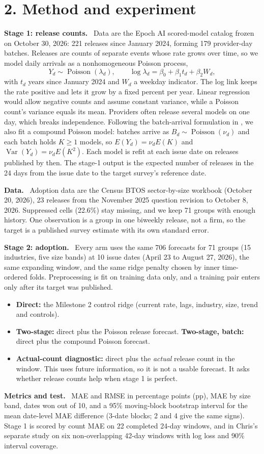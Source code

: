\documentclass[10pt]{article}
\newcommand{\sub}[1]{\textbf{#1}\ }
\begin{document}
\section{2. Method and experiment}
\sub{Stage 1: release counts.} Data are the Epoch AI scored-model catalog frozen on October 30, 2026: 221 releases since January 2024, forming 179 provider-day batches. Releases are counts of separate events whose rate grows over time, so we model daily arrivals as a nonhomogeneous Poisson process,
\[
Y_d\sim\operatorname{Poisson}(\lambda_d),\qquad \log\lambda_d=\beta_0+\beta_1 t_d+\beta_2 W_d,
\]
with $t_d$ years since January 2024 and $W_d$ a weekday indicator. The log link keeps the rate positive and lets it grow by a fixed percent per year. Linear regression would allow negative counts and assume constant variance, while a Poisson count's variance equals its mean. Providers often release several models on one day, which breaks independence. Following the batch-arrival formulation in \cite{compound}, we also fit a compound Poisson model: batches arrive as $B_d\sim\operatorname{Poisson}(\nu_d)$ and each batch holds $K\ge1$ models, so $E(Y_d)=\nu_dE(K)$ and $\operatorname{Var}(Y_d)=\nu_dE(K^2)$. Each model is refit at each issue date on releases published by then. The stage-1 output is the expected number of releases in the 24 days from the issue date to the target survey's reference date.

\sub{Data.} Adoption data are the Census BTOS sector-by-size workbook (October 20, 2026), 23 releases from the November 2025 question revision to October 8, 2026. Suppressed cells (22.6\%) stay missing, and we keep 71 groups with enough history. One observation is a group in one biweekly release, not a firm, so the target is a published survey estimate with its own standard error.

\sub{Stage 2: adoption.} Every arm uses the same 706 forecasts for 71 groups (15 industries, five size bands) at 10 issue dates (April 23 to August 27, 2026), the same expanding window, and the same ridge penalty chosen by inner time-ordered folds. Preprocessing is fit on training data only, and a training pair enters only after its target was published.
\begin{itemize}
\item \textbf{Direct:} the Milestone 2 control ridge (current rate, lags, industry, size, trend and controls).
\item \textbf{Two-stage:} direct plus the Poisson release forecast. \textbf{Two-stage, batch:} direct plus the compound Poisson forecast.
\item \textbf{Actual-count diagnostic:} direct plus the \emph{actual} release count in the window. This uses future information, so it is not a usable forecast. It asks whether release counts help when stage 1 is perfect.
\end{itemize}
\sub{Metrics and test.} MAE and RMSE in percentage points (pp), MAE by size band, dates won out of 10, and a 95\% moving-block bootstrap interval for the mean date-level MAE difference (3-date blocks; 2 and 4 give the same signs). Stage 1 is scored by count MAE on 22 completed 24-day windows, and in Chris's separate study on six non-overlapping 42-day windows with log loss and 90\% interval coverage.
\end{document}
